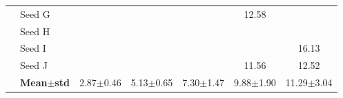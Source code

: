\begin{table}[H]
{\begin{tabular}{@{}llccccc@{}}
 & Seed G & \cellcolor{RoyalBlue!10}{\small 2.76} & \cellcolor{RoyalBlue!10}{\small 3.93} & \cellcolor{RoyalBlue!10}{\small 7.37} & {\small\color{gray!60!black}12.58} & \cellcolor{RoyalBlue!10}{\small 8.11} \\
 & Seed H & \cellcolor{RoyalBlue!10}{\small 3.43} & \cellcolor{RoyalBlue!10}{\small 5.03} & \cellcolor{RoyalBlue!10}{\small 7.35} & \cellcolor{RoyalBlue!10}{\small 8.84} & \cellcolor{RoyalBlue!10}{\small 9.29} \\
 & Seed I & \cellcolor{RoyalBlue!10}{\small 3.17} & \cellcolor{RoyalBlue!10}{\small 6.15} & \cellcolor{RoyalBlue!10}{\small 6.65} & \cellcolor{RoyalBlue!10}{\small 7.95} & {\small\color{gray!60!black}16.13} \\
 & Seed J & \cellcolor{RoyalBlue!10}{\small 3.63} & \cellcolor{RoyalBlue!10}{\small 5.01} & \cellcolor{RoyalBlue!10}{\small 9.78} & {\small\color{gray!60!black}11.56} & {\small\color{gray!60!black}12.52} \\
 & \textbf{Mean$\pm$std} & \cellcolor{RoyalBlue!20}2.87$\pm$0.46 & \cellcolor{RoyalBlue!20}5.13$\pm$0.65 & \cellcolor{RoyalBlue!20}7.30$\pm$1.47 & \cellcolor{RoyalBlue!20}9.88$\pm$1.90 & \cellcolor{red!12}11.29$\pm$3.04 \\
\bottomrule
\end{tabular}
}
\end{table}

